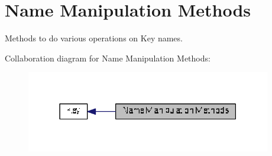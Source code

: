 \hypertarget{group__keyname}{\section{Name Manipulation Methods}
\label{group__keyname}
}


Methods to do various operations on Key names.  


Collaboration diagram for Name Manipulation Methods\+:
\nopagebreak
\begin{figure}[H]
\begin{center}
\leavevmode
\includegraphics[width=303pt]{group__keyname}
\end{center}
\end{figure}
